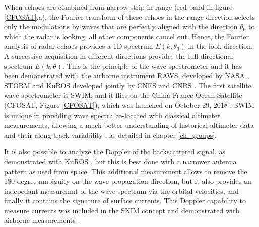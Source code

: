 When echoes are combined from narrow strip in range (red band in figure 
\ref{CFOSAT}.a), the Fourier transform of these echoes in the range direction selects only the modulations by waves that are perfectly aligned with the direction 
$\theta_0$ to which the radar is looking, all other components cancel out.  Hence, the Fourier analysis of radar echoes provides a 1D spectrum  $E(k,\theta_0)$  
in the look direction. 
A successive acquisition in different directions provides the full directional spectrum $E(k,\theta)$.  
This is the principle of the wave spectrometer and it has been demonstrated with the airborne instrument
RAWS, developed by NASA \citep{Jackson&al.1985}, STORM and KuROS developed jointly by CNES and CNRS \citep{Hauser&al.1992,Caudal&al.2014}.
The first satellite wave spectrometer is SWIM, and it flies on the China-France Ocean Satellite (CFOSAT, Figure \ref{CFOSAT}), which was launched on October 29, 2018 \citep{Hauser&al.2021}. SWIM is unique in providing wave spectra co-located with classical altimeter measurements, allowing a much better understanding of historical altimeter data and their along-track variability \citep{DeCarlo&al.2023}, as detailed in chapter \ref{ch_groups}. 


It is also possible to analyze the Doppler of the backscattered signal, as demonstrated with KuROS \citep{Caudal&al.2014}, but this is best done with a narrower antenna pattern as used from space. This additional measurement allows to remove the 180 degree ambiguity on the 
wave propagation direction, but it also provides an indepedant measuremnt of the wave spectrum via the orbital velocities, and finally it contains the signature of 
surface currents.  This Doppler capability to measure currents was included in the SKIM concept \citep{Ardhuin&al.2019e} and demonstrated with airborne measurements \citep{Marie&al.2020}.



